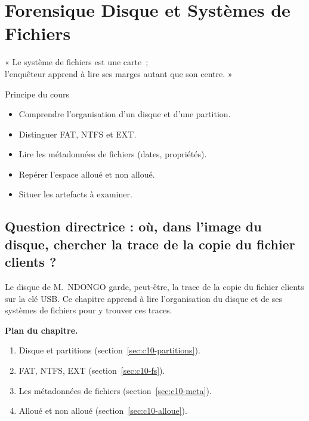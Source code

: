 
\chapter{Forensique Disque et Systèmes de Fichiers}
\label{chap:disque}

\epigraph{%
    « Le système de fichiers est une carte~;\\
    l'enquêteur apprend à lire ses marges autant que son centre. »%
}{Principe du cours}


\begin{boxobjectifs}
\begin{itemize}
    \item Comprendre l'organisation d'un disque et d'une partition.
    \item Distinguer FAT, NTFS et EXT.
    \item Lire les métadonnées de fichiers (dates, propriétés).
    \item Repérer l'espace alloué et non alloué.
    \item Situer les artefacts à examiner.
\end{itemize}
\end{boxobjectifs}

\bigskip

\section*{Question directrice : où, dans l'image du disque, chercher la trace de la copie du fichier clients ?}

Le disque de M.~NDONGO garde, peut-être, la trace de la copie du fichier
clients sur la clé USB. Ce chapitre apprend à lire l'organisation du disque et
de ses systèmes de fichiers pour y trouver ces traces.

\medskip
\textbf{Plan du chapitre.}
\begin{enumerate}
    \item Disque et partitions (section~\ref{sec:c10-partitions}).
    \item FAT, NTFS, EXT (section~\ref{sec:c10-fs}).
    \item Les métadonnées de fichiers (section~\ref{sec:c10-meta}).
    \item Alloué et non alloué (section~\ref{sec:c10-alloue}).
\end{enumerate}

